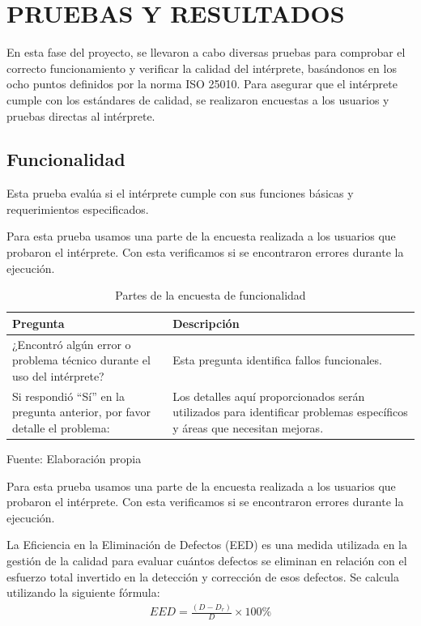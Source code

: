 \chapter{PRUEBAS Y RESULTADOS}
En esta fase del proyecto, se llevaron a cabo diversas pruebas para comprobar el correcto funcionamiento y verificar la calidad del intérprete, basándonos en los ocho puntos definidos por la norma ISO 25010. Para asegurar que el intérprete cumple con los estándares de calidad, se realizaron encuestas a los usuarios y pruebas directas al intérprete.

\section{Funcionalidad}
Esta prueba evalúa si el intérprete cumple con sus funciones básicas y requerimientos especificados.

Para esta prueba usamos una parte de la encuesta realizada a los usuarios que probaron el intérprete. Con esta verificamos si se encontraron errores durante la ejecución.
\begin{table}[!h]
  \begin{center}
    \begin{tabularx}{0.9\textwidth}{|X|X|}
      \hline
      \textbf{Pregunta} & \textbf{Descripción} \\
      \hline
      ¿Encontró algún error o problema técnico durante el uso del intérprete? & Esta pregunta identifica fallos funcionales. \\
      \hline
      Si respondió ``Sí'' en la pregunta anterior, por favor detalle el problema: & Los detalles aquí proporcionados serán utilizados para identificar problemas específicos y áreas que necesitan mejoras. \\
      \hline
    \end{tabularx}
  \end{center}
  \caption{Partes de la encuesta de funcionalidad}
  \centering Fuente: Elaboración propia
  \label{tab:funcionalidad}
\end{table}

Para esta prueba usamos una parte de la encuesta realizada a los usuarios que probaron el intérprete. Con esta verificamos si se encontraron errores durante la ejecución.

La Eficiencia en la Eliminación de Defectos (EED) es una medida utilizada en la gestión de la calidad para evaluar cuántos defectos se eliminan en relación con el esfuerzo total invertido en la detección y corrección de esos defectos. Se calcula utilizando la siguiente fórmula:
\begin{equation*}
  \begin{split}
    EED = \frac{(D - D_r)}{D} \times 100\%
  \end{split}
\end{equation*}

